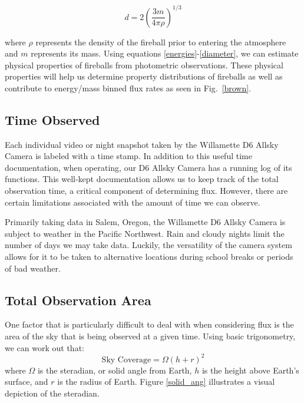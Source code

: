 \begin{equation}
d = 2(\frac{3m}{4\pi \rho})^{1/3}
\label{diameter}
\end{equation}

where $\rho$ represents the density of the fireball prior to entering the atmosphere and $m$ represents its mass. 
Using equations \ref{energies}-\ref{diameter}, we can estimate physical properties of fireballs from photometric observations.
These physical properties will help us determine property distributions of fireballs as well as contribute to energy/mass binned flux rates as seen in Fig.~\ref{brown}.



\subsection{Time Observed}

Each individual video or night snapshot taken by the Willamette D6 Allsky Camera is labeled with a time stamp.  
In addition to this useful time documentation, when operating, our D6 Allsky Camera has a running log of its functions.
This well-kept documentation allows us to keep track of the total observation time, a critical component of determining flux.  
However, there are certain limitations associated with the amount of time we can observe.

Primarily taking data in Salem, Oregon, the Willamette D6 Allsky Camera is subject to weather in the Pacific Northwest.  
Rain and cloudy nights limit the number of days we may take data.
Luckily, the versatility of the camera system allows for it to be taken to alternative locations during school breaks or periods of bad weather.


\subsection{Total Observation Area}
One factor that is particularly difficult to deal with when considering flux is the area of the sky that is being observed at a given time.
Using basic trigonometry, we can work out that:
\begin{equation}
    \text{Sky Coverage} = \Omega(h+r)^2
    \label{area_eq}
\end{equation}
where $\Omega$ is the steradian, or solid angle from Earth, $h$ is the height above Earth's surface, and $r$ is the radius of Earth.
Figure \ref{solid_ang} illustrates a visual depiction of the steradian.  

